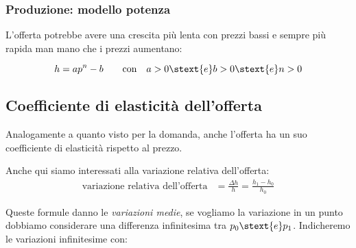 \subsubsection{Produzione: modello potenza}

L'offerta potrebbe avere una crescita più lenta con prezzi bassi e sempre più 
rapida man mano che i prezzi aumentano:

\[h= a p^n-b \qquad \text{con} \quad a > 0 \stext{ e } b > 0 
\stext{ e } n > 0\]


\pagebreak %

\subsection{Coefficiente di elasticità dell'offerta}
\label{subsec:modelli_elasticita_offerta}

Analogamente a quanto visto per la domanda, anche l'offerta ha un suo 
coefficiente di elasticità rispetto al prezzo.

Anche qui siamo interessati alla variazione relativa dell'offerta:
\begin{align*}
\text{variazione relativa dell'offerta} &= 
\frac{\Delta h}{h} = \frac{h_1 - h_0}{h_0}
\end{align*}

Queste formule danno le \emph{variazioni medie}, se vogliamo la variazione 
in un punto dobbiamo considerare una differenza infinitesima tra 
\(p_0 \stext{e} p_1\). Indicheremo le variazioni infinitesime con:

